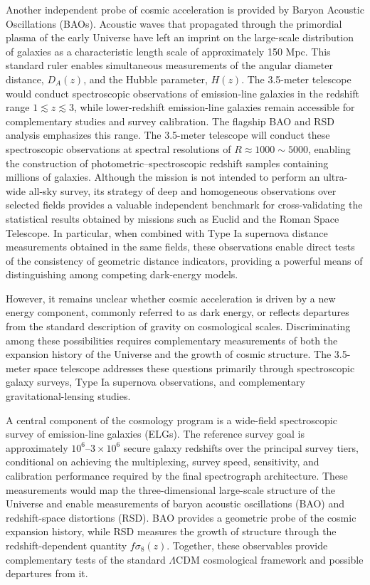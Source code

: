 Another independent probe of cosmic acceleration is provided by Baryon Acoustic Oscillations (BAOs). Acoustic waves that propagated through the primordial plasma of the early Universe have left an imprint on the large-scale distribution of galaxies as a characteristic length scale of approximately 150 Mpc. This standard ruler enables simultaneous measurements of the angular diameter distance, $D_A(z)$, and the Hubble parameter, $H(z)$. The 3.5-meter telescope would conduct spectroscopic observations of emission-line galaxies in the redshift range $1\lesssim z\lesssim3$, while lower-redshift emission-line galaxies remain accessible for complementary studies and survey calibration. The flagship BAO and RSD analysis emphasizes this range. The 3.5-meter telescope will conduct these spectroscopic observations at spectral resolutions of $R \approx 1000 \sim 5000$, enabling the construction of photometric--spectroscopic redshift samples containing millions of galaxies. Although the mission is not intended to perform an ultra-wide all-sky survey, its strategy of deep and homogeneous observations over selected fields provides a valuable independent benchmark for cross-validating the statistical results obtained by missions such as Euclid and the Roman Space Telescope. In particular, when combined with Type Ia supernova distance measurements obtained in the same fields, these observations enable direct tests of the consistency of geometric distance indicators, providing a powerful means of distinguishing among competing dark-energy models.

However, it remains unclear whether cosmic acceleration is driven by a new energy component, commonly referred to as dark energy, or reflects departures from the standard description of gravity on cosmological scales. Discriminating among these possibilities requires complementary measurements of both the expansion history of the Universe and the growth of cosmic structure. The 3.5-meter space telescope addresses these questions primarily through spectroscopic galaxy surveys, Type Ia supernova observations, and complementary gravitational-lensing studies.

A central component of the cosmology program is a wide-field spectroscopic survey of emission-line galaxies (ELGs). The reference survey goal is approximately \(10^{6}\)--\(3\times10^{6}\) secure galaxy redshifts over the principal survey tiers, conditional on achieving the multiplexing, survey speed, sensitivity, and calibration performance required by the final spectrograph architecture. These measurements would map the three-dimensional large-scale structure of the Universe and enable measurements of baryon acoustic oscillations (BAO) and redshift-space distortions (RSD). BAO provides a geometric probe of the cosmic expansion history, while RSD measures the growth of structure through the redshift-dependent quantity \(f\sigma_{8}(z)\). Together, these observables provide complementary tests of the standard \(\Lambda\)CDM cosmological framework and possible departures from it.

